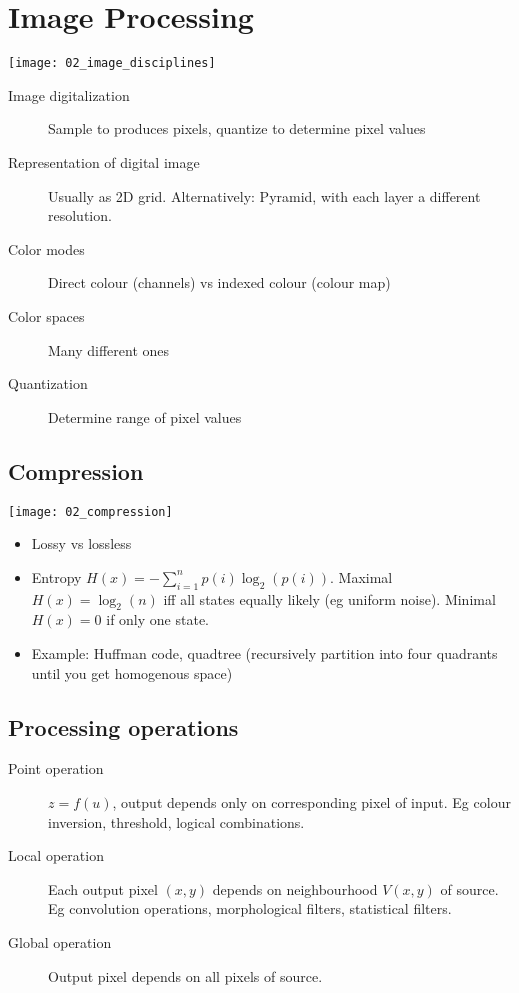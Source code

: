 \section{Image Processing}

\texttt{[image: 02\_image\_disciplines]}

\begin{description}
		\item[Image digitalization] Sample to produces pixels, quantize to determine pixel values
		\item[Representation of digital image] Usually as 2D grid.
				Alternatively: Pyramid, with each layer a different resolution.
		\item[Color modes] Direct colour (channels) vs indexed colour (colour map)
		\item[Color spaces] Many different ones
		\item[Quantization] Determine range of pixel values
\end{description}


\subsection{Compression}

\texttt{[image: 02\_compression]}

\begin{itemize}
		\item Lossy vs lossless
		\item Entropy $H(x) = - \sum_{i=1}^n p(i) \log_2(p(i))$. Maximal $H(x)
				= \log_2(n)$ iff all states equally likely (eg uniform noise).
				Minimal $H(x) = 0$ if only one state.
		\item Example: Huffman code, quadtree (recursively partition into four
				quadrants until you get homogenous space)
\end{itemize}

\subsection{Processing operations}

\begin{description}
		\item[Point operation] $z = f(u)$, output depends only on corresponding
				pixel of input. Eg colour inversion, threshold, logical
				combinations.
		\item[Local operation] Each output pixel $(x, y)$ depends on
				neighbourhood $V(x, y)$ of source. Eg convolution operations,
				morphological filters, statistical filters.
		\item[Global operation] Output pixel depends on all pixels of source.
\end{description}

